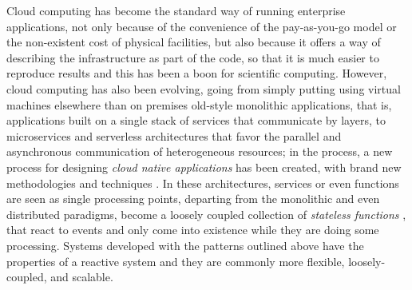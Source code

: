 \documentclass[review]{elsarticle}
\begin{document}
Cloud computing has become the standard way of running
enterprise applications, not only because of the convenience of the
pay-as-you-go model or the non-existent cost of physical facilities, but also because
it offers a way of describing the infrastructure as part of the code, so that it
is much easier to reproduce results and this has been a boon for scientific
computing.  However,  cloud computing has also been evolving, going from simply
putting using virtual machines elsewhere than on premises old-style monolithic applications, that is, applications
built on a single stack of services that communicate by layers, to microservices
\cite{microservices} and serverless architectures \cite{varghese2018next,Varghese2018849} that favor the parallel and asynchronous communication of
heterogeneous resources; in the process, a new process for designing {\em cloud
native applications} has been created, with brand new methodologies and
techniques \cite{Baldini2016287}. In these architectures, services or even
functions are seen as single processing points, departing from the monolithic
and even distributed paradigms, become a loosely coupled collection of {\em
stateless functions} \cite{malawski2017serverless}, that react to events and
only come into existence while they are doing some processing.
Systems developed with the patterns outlined above have the
properties of a reactive system \cite{boner2014reactive} and they are commonly
more flexible, loosely-coupled, and scalable. %
\end{document}
